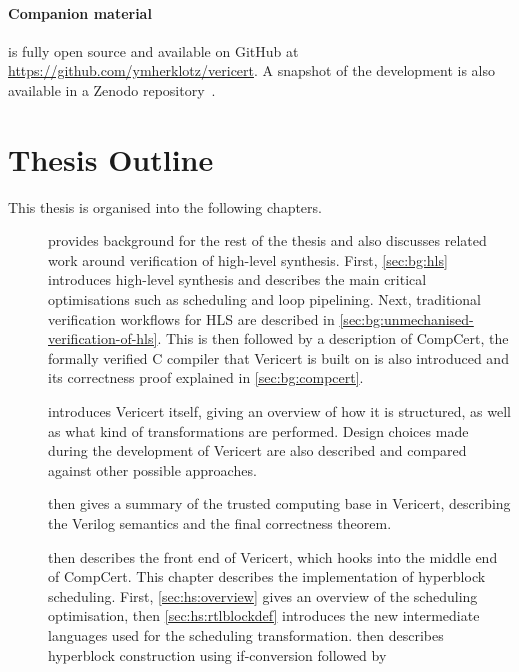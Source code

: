 \paragraph{Companion material}
\vericert{} is fully open source and available on GitHub at
\url{https://github.com/ymherklotz/vericert}. A snapshot of the \vericert{}
development is also available in a Zenodo
repository~\cite{herklotz21_v}.

\section{Thesis Outline}

This thesis is organised into the following chapters.

\begin{description}
\item[] provides background for the rest of the thesis and
  also discusses related work around verification of high-level synthesis.
  First, \cref{sec:bg:hls} introduces high-level synthesis and describes the
  main critical optimisations such as scheduling and loop pipelining. Next,
  traditional verification workflows for \gls{HLS} are described in
  \cref{sec:bg:unmechanised-verification-of-hls}. This is then followed by a
  description of \gls{CompCert}, the formally verified C compiler that Vericert
  is built on is also introduced and its correctness proof explained in
  \cref{sec:bg:compcert}.
\item[] introduces Vericert itself, giving an
  overview of how it is structured, as well as what kind of transformations are
  performed.  Design choices made during the development of Vericert are also
  described and compared against other possible approaches.
\item[] then gives a summary of the trusted
  computing base in Vericert, describing the Verilog semantics and the final
  correctness theorem.
\item[] then describes the front end of
  Vericert, which hooks into the middle end of \gls{CompCert}.  This chapter
  describes the implementation of hyperblock scheduling.  First,
  \cref{sec:hs:overview} gives an overview of the scheduling optimisation, then
  \cref{sec:hs:rtlblockdef} introduces the new intermediate languages used for
  the scheduling transformation.   then describes
  hyperblock construction using if-conversion followed by

\end{description}

